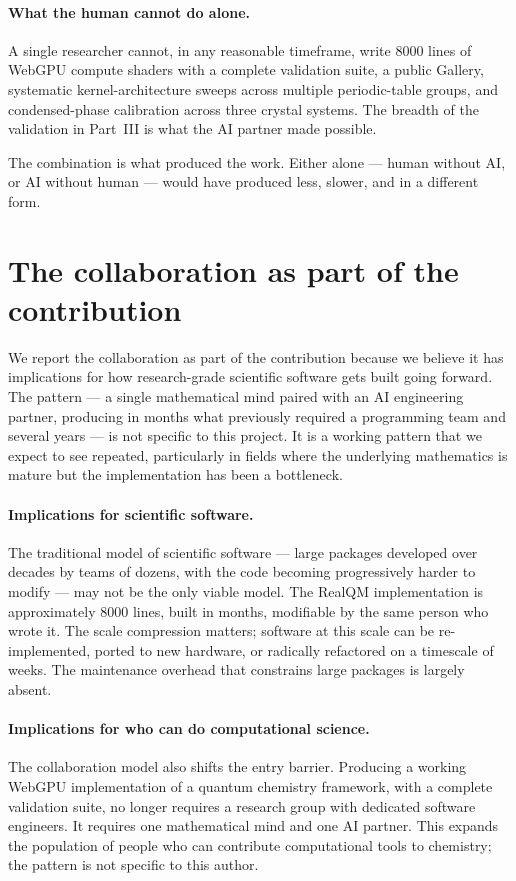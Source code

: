 \paragraph{What the human cannot do alone.}
A single researcher cannot, in any reasonable timeframe, write 8000 lines of WebGPU compute shaders with a complete validation suite, a public Gallery, systematic kernel-architecture sweeps across multiple periodic-table groups, and condensed-phase calibration across three crystal systems. The breadth of the validation in Part~III is what the AI partner made possible.

The combination is what produced the work. Either alone --- human without AI, or AI without human --- would have produced less, slower, and in a different form.

\section{The collaboration as part of the contribution}\label{sec:collab-contribution}

We report the collaboration as part of the contribution because we believe it has implications for how research-grade scientific software gets built going forward. The pattern --- a single mathematical mind paired with an AI engineering partner, producing in months what previously required a programming team and several years --- is not specific to this project. It is a working pattern that we expect to see repeated, particularly in fields where the underlying mathematics is mature but the implementation has been a bottleneck.

\paragraph{Implications for scientific software.}
The traditional model of scientific software --- large packages developed over decades by teams of dozens, with the code becoming progressively harder to modify --- may not be the only viable model. The RealQM implementation is approximately 8000 lines, built in months, modifiable by the same person who wrote it. The scale compression matters; software at this scale can be re-implemented, ported to new hardware, or radically refactored on a timescale of weeks. The maintenance overhead that constrains large packages is largely absent.

\paragraph{Implications for who can do computational science.}
The collaboration model also shifts the entry barrier. Producing a working WebGPU implementation of a quantum chemistry framework, with a complete validation suite, no longer requires a research group with dedicated software engineers. It requires one mathematical mind and one AI partner. This expands the population of people who can contribute computational tools to chemistry; the pattern is not specific to this author.

